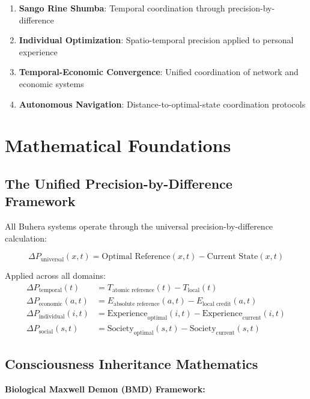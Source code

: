 \documentclass[12pt,a4paper]{article}
\begin{document}
\begin{enumerate}
\item \textbf{Sango Rine Shumba}: Temporal coordination through precision-by-difference
\item \textbf{Individual Optimization}: Spatio-temporal precision applied to personal experience
\item \textbf{Temporal-Economic Convergence}: Unified coordination of network and economic systems
\item \textbf{Autonomous Navigation}: Distance-to-optimal-state coordination protocols
\end{enumerate}

\section{Mathematical Foundations}

\subsection{The Unified Precision-by-Difference Framework}

All Buhera systems operate through the universal precision-by-difference calculation:

\begin{equation}
\Delta P_{\text{universal}}(x,t) = \text{Optimal Reference}(x,t) - \text{Current State}(x,t)
\label{eq:universal_precision}
\end{equation}

Applied across all domains:
\begin{align}
\Delta P_{\text{temporal}}(t) &= T_{\text{atomic reference}}(t) - T_{\text{local}}(t)\\
\Delta P_{\text{economic}}(a,t) &= E_{\text{absolute reference}}(a,t) - E_{\text{local credit}}(a,t)\\
\Delta P_{\text{individual}}(i,t) &= \text{Experience}_{\text{optimal}}(i,t) - \text{Experience}_{\text{current}}(i,t)\\
\Delta P_{\text{social}}(s,t) &= \text{Society}_{\text{optimal}}(s,t) - \text{Society}_{\text{current}}(s,t)
\end{align}

\subsection{Consciousness Inheritance Mathematics}

\textbf{Biological Maxwell Demon (BMD) Framework:}
\end{document}
